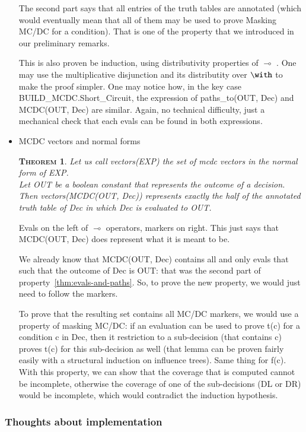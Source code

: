 \documentclass[a4paper,12pt,twoside]{article}
\newtheorem{theorem}{\textsc{Theorem}}
\begin{document}
\begin{itemize}
The second part says that all entries of the truth tables are
annotated (which would eventually mean that all of them may be used to
prove Masking MC/DC for a condition). That is one of the property that
we introduced in our preliminary remarks.

This is also proven be induction, using distributivity properties of
$\multimap$ . One may use the multiplicative disjunction and its
distributity over $\with$ to make the proof simpler. One may notice
how, in the key case BUILD\_MCDC.Short\_Circuit, the expression of
paths\_to(OUT, Dec) and MCDC(OUT, Dec) are similar. Again, no
technical difficulty, just a mechanical check that each evals can be
found in both expressions.

\item MCDC vectors and normal forms
\begin{theorem}
  \label{thm:vectors-and-mcdc}
  Let us call vectors(EXP) the set of mcdc vectors in the normal form of EXP.\\
  Let OUT be a boolean constant that represents the outcome of a decision.\\
  Then vectors(MCDC(OUT, Dec)) represents exactly the half of the annotated
  truth table of Dec in which Dec is evaluated to OUT.
\end{theorem}


Evals on the left of $\multimap$ operators, markers on right. This
just says that MCDC(OUT, Dec) does represent what it is meant to
be.

We already know that MCDC(OUT, Dec) contains all and only evals that
such that the outcome of Dec is OUT: that was the second part of
property~\ref{thm:evals-and-paths}. So, to prove the new property, we
would just need to follow the markers.

To prove that the resulting set contains all MC/DC markers, we would
use a property of masking MC/DC: if an evaluation can be used to prove
t(c) for a condition c in Dec, then it restriction to a sub-decision
(that contains c) proves t(c) for this sub-decision as well (that
lemma can be proven fairly easily with a structural induction on
influence trees). Same thing for f(c). With this property, we can show
that the coverage that is computed cannot be incomplete, otherwise the
coverage of one of the sub-decisions (DL or DR) would be incomplete,
which would contradict the induction hypothesis.
\end{itemize}

\subsubsection{Thoughts about implementation}
\end{document}
